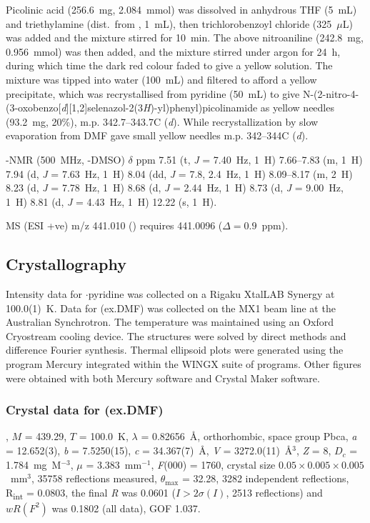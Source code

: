 \begin{refsection}
    Picolinic acid (256.6~mg, 2.084~mmol) was dissolved in anhydrous THF (5~mL) and triethylamine (dist.\ from , 1~mL), then trichlorobenzoyl chloride (325~$\mu$L) was added and the mixture stirred for 10~min.
    The above nitroaniline  (242.8~mg, 0.956~mmol) was then added, and the mixture stirred under argon for 24~h, during which time the dark red colour faded to give a yellow solution.
    The mixture was tipped into water (100~mL) and filtered to afford a yellow precipitate, which was recrystallised from pyridine (50~mL) to give  N-(2-nitro-4-(3-oxobenzo[\emph{d}][1,2]selenazol-2(3\emph{H})-yl)phenyl)picolinamide  as yellow needles (93.2~mg, 20\%), m.p. 342.7--343.7\degree{}C (\emph{d}).
    While recrystallization by slow evaporation from DMF gave small yellow needles m.p. 342--344\degree{}C (\emph{d}).
    
    -NMR (500~MHz, -DMSO) $\delta$ ppm
    7.51 (t, \emph{J} = 7.40~Hz, 1~H) 7.66--7.83 (m, 1~H) 7.94 (d, \emph{J} = 7.63~Hz, 1~H) 8.04 (dd, \emph{J} = 7.8, 2.4~Hz, 1~H) 8.09--8.17 (m, 2~H) 8.23 (d, \emph{J} = 7.78~Hz, 1~H) 8.68 (d, \emph{J} = 2.44~Hz, 1~H) 8.73 (d, \emph{J} = 9.00~Hz, 1~H) 8.81 (d, \emph{J} = 4.43~Hz, 1~H) 12.22 (s, 1~H).
    
    MS (ESI +ve) m/z 441.010 ()  requires 441.0096 ($\Delta=0.9$~ppm).
    
    
    \subsection{Crystallography}
    Intensity data for $\cdot$pyridine was collected on a Rigaku XtalLAB Synergy at 100.0(1)~K.
    Data for (ex.DMF) was collected on the MX1 beam line\autocite{Cowieson2015} at the Australian Synchrotron.
    The temperature was maintained using an Oxford Cryostream cooling device.
    The structures were solved by direct methods and difference Fourier synthesis.\autocite{Sheldrick2015}
    Thermal ellipsoid plots were generated using the program Mercury\autocite{Macrae2008} integrated within the WINGX\autocite{Farrugia1999} suite of programs.
    Other figures were obtained with both Mercury software and Crystal Maker software.
    
    \subsubsection{Crystal data for \texorpdfstring{(ex.DMF)}{C19H12N4O4Se}}
    , $M$ = 439.29, $T$ = 100.0~K, $\lambda$ = 0.82656~\AA, orthorhombic, space group Pbca, \emph{a} = 12.652(3), \emph{b} = 7.5250(15), \emph{c} = 34.367(7)~\AA, \emph{V} = 3272.0(11)~\AA$^3$, \emph{Z} = 8, $D_c$ = 1.784~mg~M$^{-3}$, $\mu$ = 3.383~mm$^{-1}$, \emph{F}(000) = 1760, crystal size $0.05 \times 0.005 \times 0.005$~mm$^3$, 35758 reflections measured, $\theta_{\max}$ = 32.28\degree{}, 3282 independent reflections, R\textsubscript{int} = 0.0803, the final \emph{R} was 0.0601 ($I > 2\sigma(I)$, 2513 reflections) and $wR(F^2)$ was 0.1802 (all data), GOF 1.037.
    

\end{refsection}
